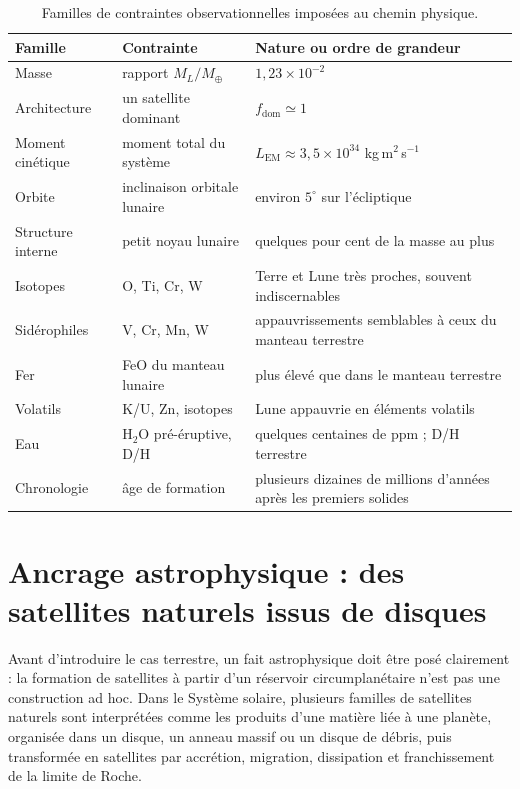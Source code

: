 \documentclass[11pt,a4paper,openany]{report}
\newcommand{\Mt}{M_{\oplus}}
\begin{document}
\begin{table}[htbp]
\centering
\small
\caption{Familles de contraintes observationnelles imposées au chemin physique.}
\label{tab:contraintes}
\begin{tabularx}{\textwidth}{>{\raggedright\arraybackslash}p{2.6cm}
>{\raggedright\arraybackslash}X >{\raggedright\arraybackslash}p{5.4cm}}
\toprule
\textbf{Famille} & \textbf{Contrainte} & \textbf{Nature ou ordre de grandeur} \\
\midrule
Masse & rapport $M_L/\Mt$ & $1{,}23\times10^{-2}$ \\
Architecture & un satellite dominant & $f_{\mathrm{dom}}\simeq1$ \\
Moment cinétique & moment total du système & $L_{\mathrm{EM}}\approx3{,}5\times10^{34}$ kg\,m$^2$\,s$^{-1}$ \\
Orbite & inclinaison orbitale lunaire & environ $5^\circ$ sur l'écliptique \\
Structure interne & petit noyau lunaire & quelques pour cent de la masse au plus \\
Isotopes & O, Ti, Cr, W & Terre et Lune très proches, souvent indiscernables \\
Sidérophiles & V, Cr, Mn, W & appauvrissements semblables à ceux du manteau terrestre \\
Fer & FeO du manteau lunaire & plus élevé que dans le manteau terrestre \\
Volatils & K/U, Zn, isotopes & Lune appauvrie en éléments volatils \\
Eau & H$_2$O pré-éruptive, D/H & quelques centaines de ppm ; D/H terrestre \\
Chronologie & âge de formation & plusieurs dizaines de millions d'années après les premiers solides \\
\bottomrule
\end{tabularx}
\end{table}


\section{Ancrage astrophysique : des satellites naturels issus de disques}

Avant d'introduire le cas terrestre, un fait astrophysique doit être posé clairement : la formation
de satellites à partir d'un réservoir circumplanétaire n'est pas une construction ad hoc. Dans le
Système solaire, plusieurs familles de satellites naturels sont interprétées comme les produits
d'une matière liée à une planète, organisée dans un disque, un anneau massif ou un disque de
débris, puis transformée en satellites par accrétion, migration, dissipation et franchissement de
la limite de Roche.
\end{document}
